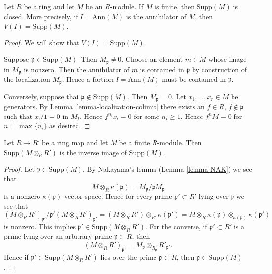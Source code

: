 \begin{lemma}
\label{lemma-support-closed}
Let $R$ be a ring and let $M$ be an $R$-module.
If $M$ is finite, then $\text{Supp}(M)$ is closed.
More precisely, if $I = \text{Ann}(M)$ is the annihilator of $M$, then
$V(I) = \text{Supp}(M)$.
\end{lemma}

\begin{proof}
We will show that $V(I) = \text{Supp}(M)$.

\medskip\noindent
Suppose $\mathfrak p \in \text{Supp}(M)$. Then $M_{\mathfrak p} \not = 0$.
Choose an element $m \in M$ whose image in $M_\mathfrak p$ is nonzero.
Then the annihilator of $m$ is contained in $\mathfrak p$ by construction
of the localization $M_\mathfrak p$. Hence
a fortiori $I = \text{Ann}(M)$ must be contained in $\mathfrak p$.

\medskip\noindent
Conversely, suppose that $\mathfrak p \not \in \text{Supp}(M)$.
Then $M_{\mathfrak p} = 0$.
Let $x_1, \ldots, x_r \in M$ be generators.
By Lemma \ref{lemma-localization-colimit} there exists
an $f \in R$, $f\not\in \mathfrak p$ such that
$x_i/1 = 0$ in $M_f$. Hence $f^{n_i} x_i = 0$ for some $n_i \geq 1$.
Hence $f^nM = 0$ for $n = \max\{n_i\}$ as desired.
\end{proof}

\begin{lemma}
\label{lemma-support-base-change}
Let $R \to R'$ be a ring map and let $M$ be a finite $R$-module.
Then $\text{Supp}(M \otimes_R R')$ is the inverse image of
$\text{Supp}(M)$.
\end{lemma}

\begin{proof}
Let $\mathfrak p \in \text{Supp}(M)$. By Nakayama's lemma
(Lemma \ref{lemma-NAK}) we see that
$$
M \otimes_R \kappa(\mathfrak p) = M_\mathfrak p/\mathfrak p M_\mathfrak p
$$
is a nonzero $\kappa(\mathfrak p)$ vector space.
Hence for every prime $\mathfrak p' \subset R'$ lying
over $\mathfrak p$ we see that
$$
(M \otimes_R R')_{\mathfrak p'}/\mathfrak p' (M \otimes_R R')_{\mathfrak p'} =
(M \otimes_R R') \otimes_{R'} \kappa(\mathfrak p') =
M \otimes_R \kappa(\mathfrak p) \otimes_{\kappa(\mathfrak p)}
\kappa(\mathfrak p')
$$
is nonzero. This implies $\mathfrak p' \in \text{Supp}(M \otimes_R R')$.
For the converse, if $\mathfrak p' \subset R'$ is a prime lying
over an arbitrary prime $\mathfrak p \subset R$, then
$$
(M \otimes_R R')_{\mathfrak p'} =
M_\mathfrak p \otimes_{R_\mathfrak p} R'_{\mathfrak p'}.
$$
Hence if $\mathfrak p' \in \text{Supp}(M \otimes_R R')$
lies over the prime $\mathfrak p \subset R$, then
$\mathfrak p \in \text{Supp}(M)$.
\end{proof}

